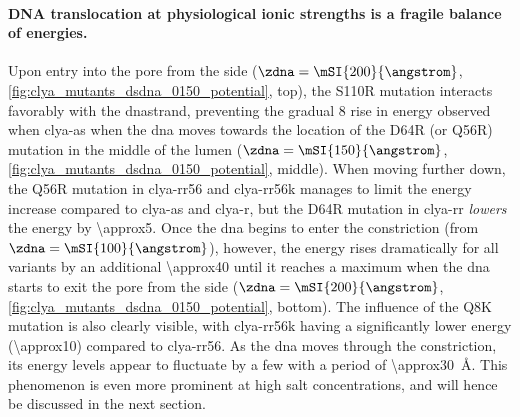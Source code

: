 \paragraph{DNA translocation at physiological ionic strengths is a fragile balance of energies.}
%
Upon entry into the pore from the \cisi{} side ($\zdna = \mSI{200}{\angstrom}$,
\cref{fig:clya_mutants_dsdna_0150_potential}, top), the S110R mutation interacts favorably with the
\gls{dna}strand, preventing the gradual \SI{+8}{\kT} rise in energy observed when \gls{clya-as} when the
\gls{dna} moves towards the location of the  D64R (or Q56R) mutation in the middle of the lumen ($\zdna =
\mSI{150}{\angstrom}$, \cref{fig:clya_mutants_dsdna_0150_potential}, middle). When moving further down, the
Q56R mutation in \gls{clya-rr56} and \gls{clya-rr56k} manages to limit the energy increase compared to
\gls{clya-as} and \gls{clya-r}, but the D64R mutation in \gls{clya-rr} \emph{lowers} the energy by
\SI{\approx5}{\kT}. Once the \gls{dna} begins to enter the constriction (from $\zdna = \mSI{100}{\angstrom}$),
however, the energy rises dramatically for all variants by an additional \SI{\approx40}{\kT} until it reaches
a maximum when the \gls{dna} starts to exit the pore from the \transi{} side ($\zdna = \mSI{200}{\angstrom}$,
\cref{fig:clya_mutants_dsdna_0150_potential}, bottom). The influence of the Q8K mutation is also clearly
visible, with \gls{clya-rr56k} having a significantly lower energy (\SI{\approx10}{\kT}) compared to
\gls{clya-rr56}. As the \gls{dna} moves through the constriction, its energy levels appear to fluctuate by a
few \si{\kT} with a period of \SI{\approx30}{\angstrom}. This phenomenon is even more prominent at high salt
concentrations, and will hence be discussed in the next section. 

